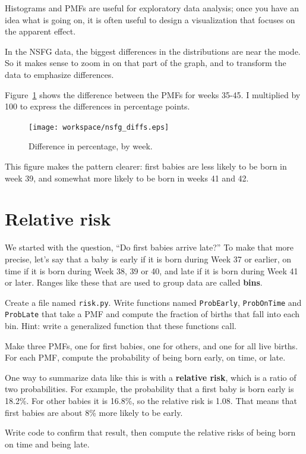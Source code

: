 \documentclass[12pt]{book}
\begin{document}
Histograms and PMFs are useful for exploratory data analysis;
once you have an idea what is going on, it is often useful to
design a visualization that focuses on the apparent effect.

In the NSFG data, the biggest differences in the distributions are
near the mode.  So it makes sense to zoom in on that part of the
graph, and to transform the data to emphasize differences.

Figure~\ref{nsfg_diffs} shows the difference between the PMFs for weeks
35-45.  I multiplied by 100 to express the differences in percentage
points.

\begin{figure}
\centerline{\texttt{[image: workspace/nsfg\_diffs.eps]}}
\caption{Difference in percentage, by week.}
\label{nsfg_diffs}
\end{figure}

This figure makes the pattern clearer: first babies are
less likely to be born in week 39, and somewhat more likely
to be born in weeks 41 and 42.


\section{Relative risk}
\label{relative.risk}

We started with the question, ``Do first babies arrive late?''  To
make that more precise, let's say that a baby is early if it is born
during Week 37 or earlier, on time if it is born during Week 38, 39 or
40, and late if it is born during Week 41 or later.  Ranges like these
that are used to group data are called {\bf bins}.

\begin{ex}

Create a file named {\tt risk.py}.
Write functions named {\tt ProbEarly}, {\tt ProbOnTime} and
{\tt ProbLate} that take a PMF and compute the fraction of births
that fall into each bin.  Hint: write a generalized function
that these functions call.

Make three PMFs, one for first babies, one for others, and one for
all live births.  For each PMF, compute the probability of being
born early, on time, or late.

One way to summarize data like this is with a {\bf relative risk},
which is a ratio of two probabilities.  For example, the probability
that a first baby is born early is 18.2\%.  For other babies it is
16.8\%, so the relative risk is 1.08.  That means that first babies
are about 8\% more likely to be early.

Write code to confirm that result, then compute the relative risks of
being born on time and being late.

\end{ex}
\end{document}
